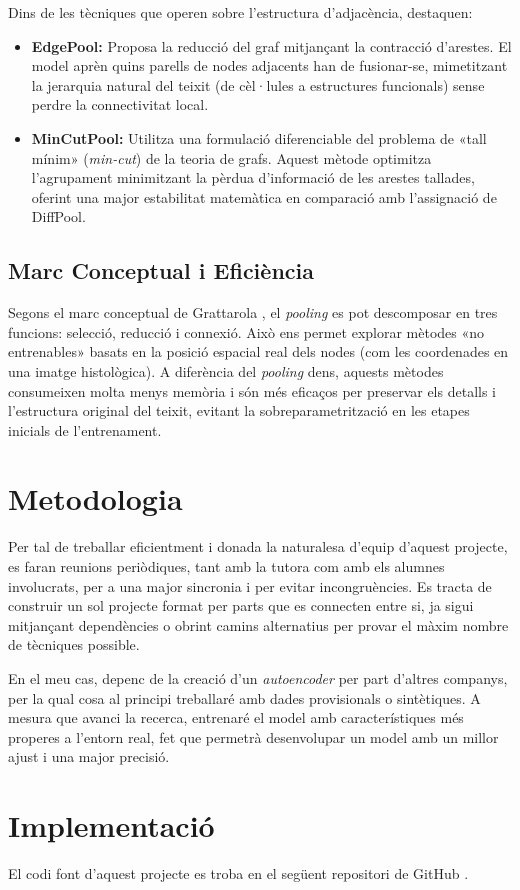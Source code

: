 ﻿\documentclass[10pt,a4paper,twocolumn,twoside]{article}
\begin{document}
Dins de les tècniques que operen sobre l'estructura d'adjacència, destaquen:

\begin{itemize}
    \item \textbf{EdgePool:} Proposa la reducció del graf mitjançant la contracció d'arestes. El model aprèn quins parells de nodes adjacents han de fusionar-se, mimetitzant la jerarquia natural del teixit (de cèl·lules a estructures funcionals) sense perdre la connectivitat local.
    \item \textbf{MinCutPool:} Utilitza una formulació diferenciable del problema de «tall mínim» (\textit{min-cut}) de la teoria de grafs. Aquest mètode optimitza l'agrupament minimitzant la pèrdua d'informació de les arestes tallades, oferint una major estabilitat matemàtica en comparació amb l'assignació de DiffPool.
\end{itemize}

\subsection{Marc Conceptual i Eficiència}

Segons el marc conceptual de Grattarola \cite{Grattarola_2024}, el \textit{pooling} es pot descomposar en tres funcions: selecció, reducció i connexió. Això ens permet explorar mètodes «no entrenables» basats en la posició espacial real dels nodes (com les coordenades en una imatge histològica). A diferència del \textit{pooling} dens, aquests mètodes consumeixen molta menys memòria i són més eficaços per preservar els detalls i l'estructura original del teixit, evitant la sobreparametrització en les etapes inicials de l'entrenament.

\section{Metodologia}

Per tal de treballar eficientment i donada la naturalesa d'equip d'aquest projecte, es faran reunions periòdiques, tant amb la tutora com amb els alumnes involucrats, per a una major sincronia i per evitar incongruències. Es tracta de construir un sol projecte format per parts que es connecten entre si, ja sigui mitjançant dependències o obrint camins alternatius per provar el màxim nombre de tècniques possible.

En el meu cas, depenc de la creació d'un \textit{autoencoder} per part d'altres companys, per la qual cosa al principi treballaré amb dades provisionals o sintètiques. A mesura que avanci la recerca, entrenaré el model amb característiques més properes a l'entorn real, fet que permetrà desenvolupar un model amb un millor ajust i una major precisió.

\section{Implementació}

El codi font d'aquest projecte es troba en el següent repositori de GitHub \cite{morillo2026codi}.

\printbibliography
\end{document}
